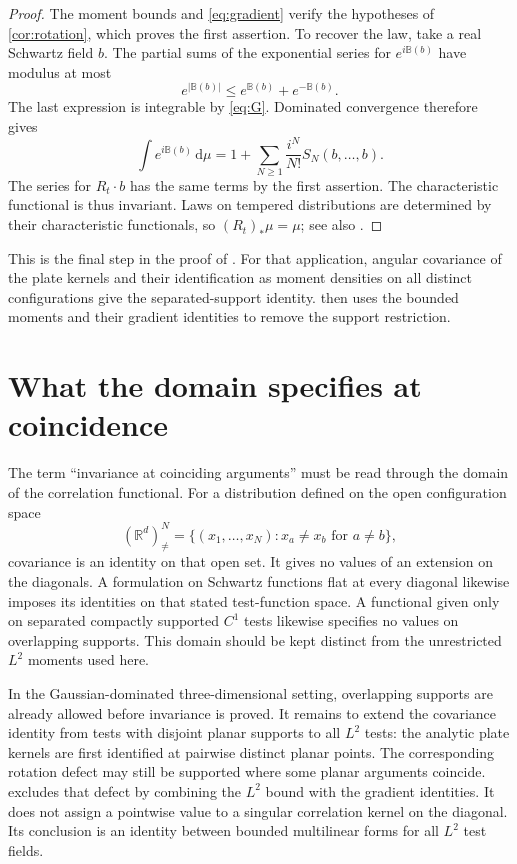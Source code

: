 \documentclass[11pt,letterpaper,reqno]{amsart}
\theoremstyle{definition}
\theoremstyle{remark}
\newcommand{\R}{\mathbb R}
\newcommand{\B}{\mathbb B}
\newcommand{\dd}{\,\mathrm d}
\begin{document}
\begin{proof}
The moment bounds and \eqref{eq:gradient} verify the hypotheses of
\cref{cor:rotation}, which proves the first assertion.
To recover the law, take a real Schwartz field $b$. The partial sums
of the exponential series for $e^{i\B(b)}$ have modulus at most
\[
 e^{|\B(b)|}\le e^{\B(b)}+e^{-\B(b)}.
\]
The last expression is integrable by \eqref{eq:G}. Dominated convergence
therefore gives
\[
 \int e^{i\B(b)}\dd\mu
 =1+\sum_{N\ge1}\frac{i^N}{N!}S_N(b,\ldots,b).
\]
The series for $R_t\cdot b$ has the same terms by the first assertion.
The characteristic functional is thus invariant. Laws on tempered
distributions are determined by their characteristic functionals,
so $(R_t)_*\mu=\mu$; see also
\cite[Section~5.2]{QEDCurrent}.
\end{proof}

This is the final step in the proof of
\cite[Theorem~8.6]{QEDCurrent}. For that application, angular
covariance of the plate kernels and their identification as moment
densities on all distinct configurations
\cite[Sections~8.9--8.10]{QEDCurrent} give the separated-support
identity.  then uses the bounded moments and their
gradient identities to remove the support restriction.

\section{What the domain specifies at coincidence}

The term ``invariance at coinciding arguments'' must be read through
the domain of the correlation functional. For a distribution defined
on the open configuration space
\[
 (\R^d)^N_{\ne}
 =\{(x_1,\ldots,x_N):x_a\ne x_b\text{ for }a\ne b\},
\]
covariance is an identity on that open set. It gives no values of an
extension on the diagonals. A formulation on Schwartz functions flat
at every diagonal likewise imposes its identities on that stated
test-function space. A functional given only on separated compactly
supported $C^1$ tests likewise specifies no values on overlapping
supports. This domain should be kept distinct from the unrestricted
$L^2$ moments used here.

In the Gaussian-dominated three-dimensional setting, overlapping
supports are already allowed before invariance is proved. It remains
to extend the covariance identity from tests with disjoint planar
supports to all $L^2$ tests: the analytic plate kernels are first
identified at pairwise distinct planar points.
The corresponding rotation defect may still be supported where some
planar arguments coincide.  excludes that
defect by combining the $L^2$ bound with the gradient identities.
It does not assign a pointwise value to a singular correlation
kernel on the diagonal. Its conclusion is an identity between
bounded multilinear forms for all $L^2$ test fields.
\end{document}
